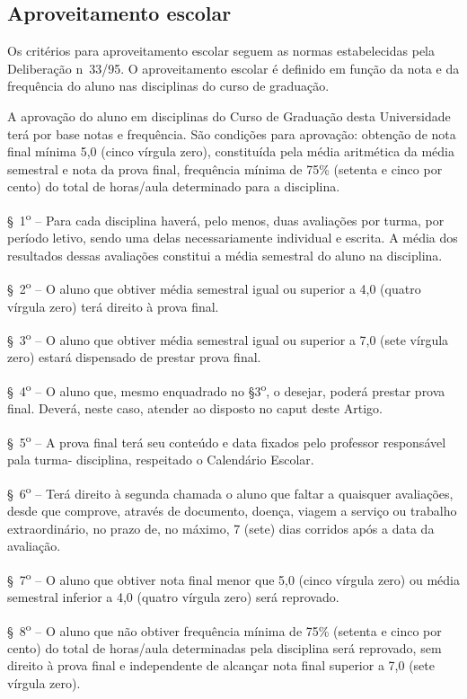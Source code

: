 \subsection{Aproveitamento escolar}
Os critérios para aproveitamento escolar seguem as normas estabelecidas pela Deliberação n\textordmasculine~33/95. O aproveitamento escolar é definido em função da nota e da frequência do aluno nas disciplinas do curso de graduação.
\begin{itquotation}
    \setcounter{artigo}{94}
    \artigo A aprovação do aluno em disciplinas do Curso de Graduação desta Universidade terá por base notas e frequência. São condições para aprovação: obtenção de nota final mínima 5,0 (cinco vírgula zero), constituída pela média aritmética da média semestral e nota da prova final, frequência mínima de 75\% (setenta e cinco por cento) do total de horas/aula determinado para a disciplina.

    \S~1\textsuperscript{o} -- Para cada disciplina haverá, pelo menos, duas avaliações por turma, por período letivo, sendo uma delas necessariamente individual e escrita. A média dos resultados dessas avaliações constitui a média semestral do aluno na disciplina.

    \S~2\textsuperscript{o} -- O aluno que obtiver média semestral igual ou superior a 4,0 (quatro vírgula zero) terá direito à prova final.

    \S~3\textsuperscript{o} -- O aluno que obtiver média semestral igual ou superior a 7,0 (sete vírgula zero) estará dispensado de prestar prova final.

    \S~4\textsuperscript{o} -- O aluno que, mesmo enquadrado no \S 3\textsuperscript{o}, o desejar, poderá prestar prova final. Deverá, neste caso, atender ao disposto no caput deste Artigo.

    \S~5\textsuperscript{o} -- A prova final terá seu conteúdo e data fixados pelo professor responsável pala turma-
    disciplina, respeitado o Calendário Escolar.

    \S~6\textsuperscript{o} -- Terá direito à segunda chamada o aluno que faltar a quaisquer avaliações, desde que
    comprove, através de documento, doença, viagem a serviço ou trabalho extraordinário, no prazo de,
    no máximo, 7 (sete) dias corridos após a data da avaliação.

    \S~7\textsuperscript{o} -- O aluno que obtiver nota final menor que 5,0 (cinco vírgula zero) ou média semestral inferior a 4,0 (quatro vírgula zero) será reprovado.

    \S~8\textsuperscript{o} -- O aluno que não obtiver frequência mínima de 75\% (setenta e cinco por cento) do total de horas/aula determinadas pela disciplina será reprovado, sem direito à prova final e independente de alcançar nota final superior a 7,0 (sete vírgula zero).
\end{itquotation}



